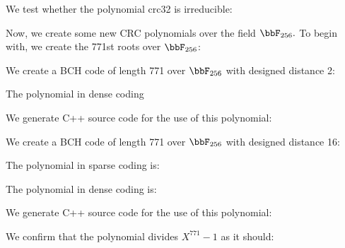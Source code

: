 %
%

We test whether the polynomial crc32 is irreducible:



\bigskip

Now, we create some new CRC polynomials over the field $\bbF_{256}.$
To begin with, we create the 771st roots over $\bbF_{256}$:


We create a BCH code of length 771 over $\bbF_{256}$ with designed distance 2:


The polynomial in dense coding


We generate C++ source code for the use of this polynomial:


We create a BCH code of length 771 over $\bbF_{256}$ with designed distance 16:


The polynomial in sparse coding is:


The polynomial in dense coding is:


We generate C++ source code for the use of this polynomial:




%
We confirm that the polynomial divides $X^{771}-1$ as it should:

